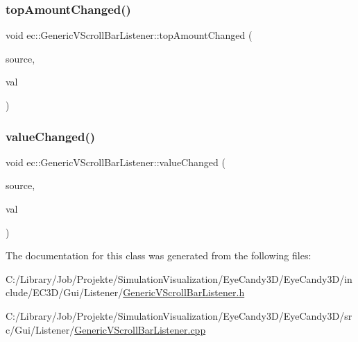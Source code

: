 \mbox{\label{classec_1_1_generic_v_scroll_bar_listener_aa781034d565c6b2f50ffea047fd0dc5f}} 
\subsubsection{\texorpdfstring{top\+Amount\+Changed()}{topAmountChanged()}}
{\footnotesize\ttfamily void ec\+::\+Generic\+V\+Scroll\+Bar\+Listener\+::top\+Amount\+Changed (\begin{DoxyParamCaption}\item[{agui\+::\+V\+Scroll\+Bar $\ast$}]{source,  }\item[{int}]{val }\end{DoxyParamCaption})\hspace{0.3cm}{\ttfamily [override]}}

\mbox{\label{classec_1_1_generic_v_scroll_bar_listener_a6718d45dd6536a326181775dc2c16570}} 
\subsubsection{\texorpdfstring{value\+Changed()}{valueChanged()}}
{\footnotesize\ttfamily void ec\+::\+Generic\+V\+Scroll\+Bar\+Listener\+::value\+Changed (\begin{DoxyParamCaption}\item[{agui\+::\+V\+Scroll\+Bar $\ast$}]{source,  }\item[{int}]{val }\end{DoxyParamCaption})\hspace{0.3cm}{\ttfamily [override]}}



The documentation for this class was generated from the following files\+:\begin{DoxyCompactItemize}
\item 
C\+:/\+Library/\+Job/\+Projekte/\+Simulation\+Visualization/\+Eye\+Candy3\+D/\+Eye\+Candy3\+D/include/\+E\+C3\+D/\+Gui/\+Listener/\mbox{\hyperlink{_generic_v_scroll_bar_listener_8h}{Generic\+V\+Scroll\+Bar\+Listener.\+h}}\item 
C\+:/\+Library/\+Job/\+Projekte/\+Simulation\+Visualization/\+Eye\+Candy3\+D/\+Eye\+Candy3\+D/src/\+Gui/\+Listener/\mbox{\hyperlink{_generic_v_scroll_bar_listener_8cpp}{Generic\+V\+Scroll\+Bar\+Listener.\+cpp}}\end{DoxyCompactItemize}
